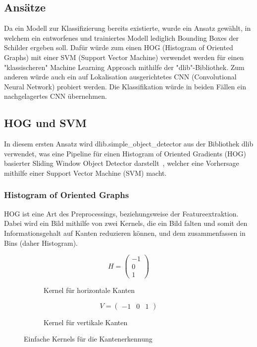 \documentclass[runningheads]{llncs}
\begin{document}
\subsection{Ansätze}
Da ein Modell zur Klassifizierung bereits existierte, wurde ein Ansatz gewählt, in welchem ein entworfenes und trainiertes Modell lediglich Bounding Boxes der Schilder ergeben soll. Dafür würde zum einen HOG (Histogram of Oriented Graphs) mit einer SVM (Support Vector Machine) verwendet werden für einen "klassischeren" Machine Learning Approach mithilfe der "dlib"-Bibliothek. Zum anderen würde auch ein auf Lokalisation ausgerichtetes CNN (Convolutional Neural Network) probiert werden. Die Klassifikation würde in beiden Fällen ein nachgelagertes CNN übernehmen.

\subsection{HOG und SVM}\label{hog_svm}
In diesem ersten Ansatz wird dlib.simple\_object\_detector aus der Bibliothek dlib verwendet, was eine Pipeline für einen Histogram of Oriented Gradients (HOG) basierter Sliding Window Object Detector darstellt~\cite{ref_dlib_docs}, welcher eine Vorhersage mithilfe einer Support Vector Machine (SVM) macht.

\subsubsection{Histogram of Oriented Graphs}
HOG ist eine Art des Preprocessings, beziehungsweise der Featureextraktion. Dabei wird ein Bild mithilfe von zwei Kernels, die ein Bild falten und somit den Informationsgehalt auf Kanten reduzieren können, und dem zusammenfassen in Bins (daher Histogram).

\begin{figure}[H]
    \centering
    \begin{subfigure}{0.45\textwidth}
        \centering
        \[
        H = \begin{pmatrix}
            -1 \\
            0 \\
            1
        \end{pmatrix}
        \]
        \caption{Kernel für horizontale Kanten}
        \label{figKernelsHorizontal}
    \end{subfigure}
    \hfill
    \begin{subfigure}{0.45\textwidth}
        \centering
        \[
        V = \begin{pmatrix}
            -1 & 0 & 1
        \end{pmatrix}
        \]
        \caption{Kernel für vertikale Kanten}
        \label{figKernelsVertical}
    \end{subfigure}
    \caption{Einfache Kernels für die Kantenerkennung}
    \label{figKernels}
\end{figure}
\end{document}
